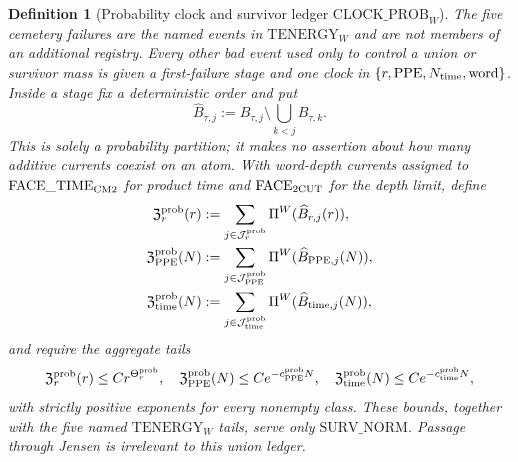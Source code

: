 \documentclass[11pt]{article}
\newtheorem{definition}[theorem]{Definition}
\begin{document}
\begin{definition}[Probability clock and survivor ledger
$\mathrm{CLOCK\_PROB}_{W}$]
\label{def:probability-clock}
The five cemetery failures are the named events in
$\mathrm{TENERGY}_{W}$ and are not members of an additional registry.
Every other bad event used only to control a union or survivor mass is given
a first-failure stage and one clock in
$\{r,\mathrm{PPE},N_{\rm time},\mathrm{word}\}$.  Inside a stage fix a
deterministic order and put
\begin{equation}
\label{eq:clock-prob-first-hit}
 \widehat B_{\tau,j}:=B_{\tau,j}\setminus\bigcup_{k<j}B_{\tau,k}.
\end{equation}
This is solely a probability partition; it makes no assertion about how many
additive currents coexist on an atom.  With word-depth currents assigned to
$\mathrm{FACE\_TIME}_{\rm CM2}$ for product time and
$\mathrm{FACE}_{\rm 2CUT}$ for the depth limit, define
\begin{align}
 \mathfrak Z_{r}^{\rm prob}(r)
 &:=\sum_{j\in\mathcal J_r^{\rm prob}}
      \Pi^W(\widehat B_{r,j}(r)),\notag\\
 \mathfrak Z_{\rm PPE}^{\rm prob}(N)
 &:=\sum_{j\in\mathcal J_{\rm PPE}^{\rm prob}}
      \Pi^W(\widehat B_{{\rm PPE},j}(N)),\notag\\
 \mathfrak Z_{\rm time}^{\rm prob}(N)
 &:=\sum_{j\in\mathcal J_{\rm time}^{\rm prob}}
      \Pi^W(\widehat B_{{\rm time},j}(N)),
 \label{eq:clock-prob-partitions}
\end{align}
and require the aggregate tails
\begin{equation}
\label{eq:clock-prob-tails}
 \mathfrak Z_r^{\rm prob}(r)\le Cr^{\Theta_r^{\rm prob}},\quad
 \mathfrak Z_{\rm PPE}^{\rm prob}(N)\le Ce^{-c_{\rm PPE}^{\rm prob}N},
 \quad
 \mathfrak Z_{\rm time}^{\rm prob}(N)\le Ce^{-c_{\rm time}^{\rm prob}N},
\end{equation}
with strictly positive exponents for every nonempty class.  These bounds,
together with the five named $\mathrm{TENERGY}_{W}$ tails, serve only
$\mathrm{SURV\_NORM}$.  Passage through Jensen is irrelevant to this union
ledger.
\end{definition}
\end{document}
